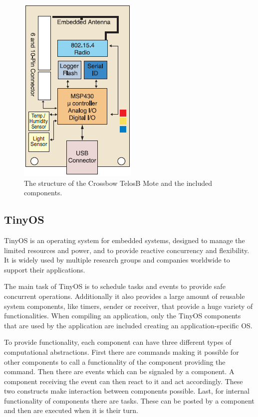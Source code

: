 \begin{figure}[htbp]
	\centering
    \includegraphics[scale=0.7]{content/images/Mote1}
   	\caption{The structure of the Crossbow TelosB Mote and the included components. \cite{Telosb}}
    \label{fig:telosb}
\end{figure}
 
\subsection{TinyOS}
TinyOS is an operating system for embedded systems, designed to manage the limited resources and power, and to provide reactive concurrency and flexibility. It is widely used by multiple research groups and companies worldwide to support their applications.

The main task of TinyOS is to schedule tasks and events to provide safe concurrent operations. Additionally it also provides a large amount of reusable system components, like timers, sender or receiver, that provide a huge variety of functionalities. When compiling an application, only the TinyOS components that are used by the application are included creating an application-specific OS.

To provide functionality, each component can have three different types of computational abstractions. First there are commands making it possible for other components to call a functionality of the component providing the command. Then there are events which can be signaled by a component. A component receiving the event can then react to it and act accordingly. These two constructs make interaction between components possible. Last, for internal functionality of components there are tasks. These can be posted by a component and then are executed when it is their turn. 

